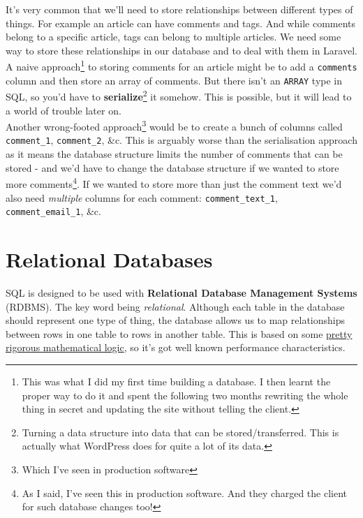 It's very common that we'll need to store relationships between different types of things. For example an article can have comments and tags. And while comments belong to a specific article, tags can belong to multiple articles. We need some way to store these relationships in our database and to deal with them in Laravel.
\\

A naive approach\footnote{This was what I did my first time building a database. I then learnt the proper way to do it and spent the following two months rewriting the whole thing in secret and updating the site without telling the client.} to storing comments for an article might be to add a \texttt{comments} column and then store an array of comments. But there isn't an \texttt{ARRAY} type in SQL, so you'd have to \textbf{serialize}\footnote{Turning a data structure into data that can be stored/transferred. This is actually what WordPress does for quite a lot of its data.} it somehow. This is possible, but it will lead to a world of trouble later on.
\\

Another wrong-footed approach\footnote{Which I've seen in production software} would be to create a bunch of columns called \texttt{comment\_1}, \texttt{comment\_2}, \&c. This is arguably worse than the serialisation approach as it means the database structure limits the number of comments that can be stored - and we'd have to change the database structure if we wanted to store more comments\footnote{As I said, I've seen this in production software. And they charged the client for such database changes too!}. If we wanted to store more than just the comment text we'd also need \textit{multiple} columns for each comment: \texttt{comment\_text\_1}, \texttt{comment\_email\_1}, \&c.

\section{Relational Databases}

SQL is designed to be used with \textbf{Relational Database Management Systems} (RDBMS). The key word being \textit{relational}. Although each table in the database should represent one type of thing, the database allows us to map relationships between rows in one table to rows in another table. This is based on some \href{https://en.wikipedia.org/wiki/Relational\_algebra}{pretty rigorous mathematical logic}, so it's got well known performance characteristics.


